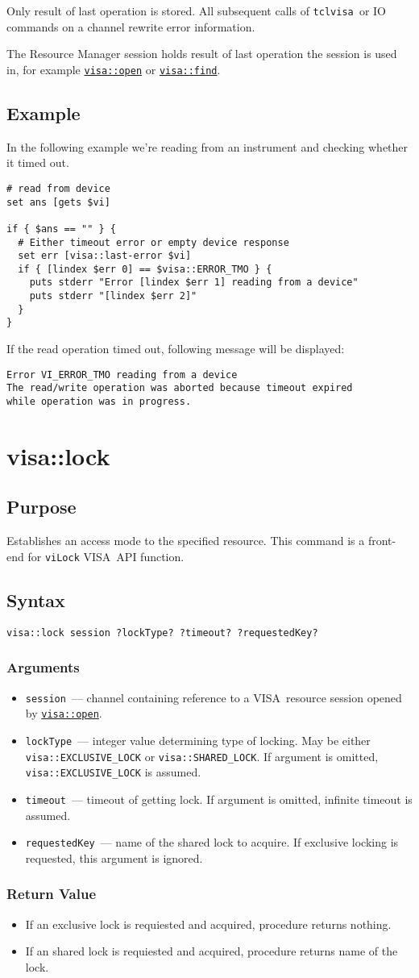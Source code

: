 \documentclass[12pt, a4paper]{report}
\newcommand{\tclvisa}{{\tt tclvisa }}
\newcommand{\VISA}{\mbox{VISA }}
\newcommand{\COMMANDREF}[1]{{\tt \hyperref[#1]{#1}}}
\newcommand{\VISACOMMANDREF}[1]{{\tt \mbox{#1}}\index{#1}}
\newcommand{\EXAMPLE}{\subsection*{Example}}
\newcommand{\PURPOSE}{\subsection*{Purpose}}
\newcommand{\SYNTAX}[1]{\subsection*{Syntax}{\tt #1}}
\newcommand{\ARGUMENTS}{\subsubsection*{Arguments}}
\newcommand{\RETURN}{\subsubsection*{Return Value}}
\newcommand{\COMMAND}[1]{\section{#1}\label{#1}}
\newcommand{\BEGINARGUMENTS}{\ARGUMENTS\begin{itemize}}
\newcommand{\ENDARGUMENTS}{\end{itemize}}
\newcommand{\ARGUMENT}[1]{\item {\tt \mbox{#1}}~---}
\newcommand{\ARGCHANNEL}{\ARGUMENT{session} channel containing reference to a \VISA resource session opened by \COMMANDREF{visa::open}.}
\begin{document}
Only result of last operation is stored. All subsequent calls of \tclvisa or IO commands on a channel rewrite error information.

The Resource Manager session holds result of last operation the session is used in, for example \COMMANDREF{visa::open} or \COMMANDREF{visa::find}.

\EXAMPLE

In the following example we're reading from an instrument and checking whether it timed out.

\begin{verbatim} 
# read from device
set ans [gets $vi]

if { $ans == "" } {
  # Either timeout error or empty device response
  set err [visa::last-error $vi]
  if { [lindex $err 0] == $visa::ERROR_TMO } {
    puts stderr "Error [lindex $err 1] reading from a device"
    puts stderr "[lindex $err 2]"
  }
}
\end{verbatim} 

If the read operation timed out, following message will be displayed:

\begin{verbatim} 
Error VI_ERROR_TMO reading from a device
The read/write operation was aborted because timeout expired 
while operation was in progress.
\end{verbatim} 


\COMMAND{visa::lock}

\PURPOSE

Establishes an access mode to the specified resource. This command is a front-end for \VISACOMMANDREF{viLock} \VISA API function.

\SYNTAX{visa::lock session ?lockType? ?timeout? ?requestedKey?}

\BEGINARGUMENTS
\ARGCHANNEL
\ARGUMENT{lockType} integer value determining type of locking. May be either {\tt visa::EXCLUSIVE\_LOCK} or {\tt visa::SHARED\_LOCK}. If argument is omitted, {\tt visa::EXCLUSIVE\_LOCK} is assumed.
\ARGUMENT{timeout} timeout of getting lock. If argument is omitted, infinite timeout is assumed.
\ARGUMENT{requestedKey} name of the shared lock to acquire. If exclusive locking is requested, this argument is ignored.
\ENDARGUMENTS

\RETURN

\begin{itemize}
\item If an exclusive lock is requiested and acquired, procedure returns nothing.
\item If an shared lock is requiested and acquired, procedure returns name of the lock.
\end{itemize}
\end{document}
